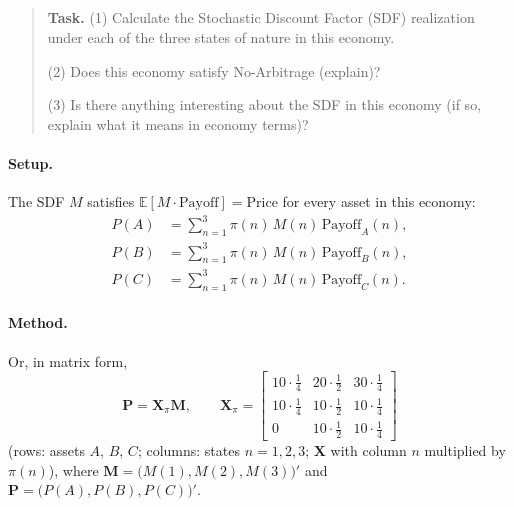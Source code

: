 \documentclass[11pt]{article}
\newcommand{\task}[1]{\begin{quote}\small\textbf{Task.} #1\end{quote}}
\begin{document}
\subsection{}\label{q1d}
\task{(1) Calculate the Stochastic Discount Factor (SDF) realization under each of the three states of nature in this economy.\par (2) Does this economy satisfy No-Arbitrage (explain)?\par (3) Is there anything interesting about the SDF in this economy (if so, explain what it means in economy terms)?}
\paragraph{Setup.}
The SDF $M$ satisfies $\mathbb{E}[M \cdot \mathrm{Payoff}] = \mathrm{Price}$ for every asset in
this economy:
\begin{align*}
  P(A) &= \sum_{n=1}^{3} \pi(n)\,M(n)\,\mathrm{Payoff}_A(n), \\
  P(B) &= \sum_{n=1}^{3} \pi(n)\,M(n)\,\mathrm{Payoff}_B(n), \\
  P(C) &= \sum_{n=1}^{3} \pi(n)\,M(n)\,\mathrm{Payoff}_C(n).
\end{align*}

\paragraph{Method.}
Or, in matrix form,
\[
  \mathbf{P} = \mathbf{X}_\pi \mathbf{M}, \qquad
  \mathbf{X}_\pi = \begin{bmatrix}
    10 \cdot \frac{1}{4} & 20 \cdot \frac{1}{2} & 30 \cdot \frac{1}{4} \\[2pt]
    10 \cdot \frac{1}{4} & 10 \cdot \frac{1}{2} & 10 \cdot \frac{1}{4} \\[2pt]
    0 & 10 \cdot \frac{1}{2} & 10 \cdot \frac{1}{4}
  \end{bmatrix}
\]
(rows: assets $A$, $B$, $C$; columns: states $n = 1, 2, 3$; $\mathbf{X}$ with column $n$ multiplied by
$\pi(n)$), where $\mathbf{M} = \big(M(1), M(2), M(3)\big)'$ and $\mathbf{P} = \big(P(A), P(B), P(C)\big)'$.
\end{document}

